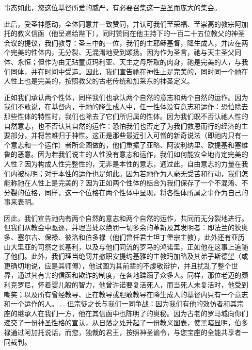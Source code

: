 事态如此，您这位基督所爱的威严，有必要召集这一至圣而庞大的集会。\par

此后，受圣神感动，全体同意并一致赞同，并认可我们至荣福、至崇高的教宗阿加托的教义信函（他呈递给陛下），同时赞同在他主持下的一百二十五位教父的神圣会议的提议，我们教导：圣三中的一位，我们的主耶稣基督，降生成人，并应在两个完美的性体内，无分裂、无混淆地受到颂扬。因为作为圣言，祂与天主圣父同体、永恒；但作为由无玷童贞玛利亚、天主之母所取的肉身，祂是完美的人，与我们同体，并在时间中受造。因此，我们宣告祂在神性上是完美的，同时同一个祂在人性上也是完美的，按照教父的古老传统和加采东的神圣定义。\par

正如我们承认两个性体，同样我们也承认两个自然的意志和两个自然的运作。因为我们不敢说，在基督内，于祂的降生成人中，任一性体没有意志和运作：恐怕除去那些性体的特性时，我们也除去了它们所归属的性体。因为我们既不否认祂人性的自然意志，也不否认其自然的运作：恐怕我们也否定了为我们救恩而行的经济的主要部分，并将苦难归于神性。这正是那些最近引入可憎的新奇说法（即祂内只有一个意志和一个运作）者所企图做的，他们重振了亚略、阿波利纳里、欧提基和塞维鲁的恶意。因为若我们说主的人性没有意志和运作，我们如何能安全地肯定完美的人性？因为构成人性完整性的，无非是本性的意志，通过此，自由意志的力量在我们内被标明；对于本性的运作也是如此。因为若祂作为人毫无受苦和行动，我们怎能称祂在人性上是完美的？因为正如两个性体的结合为我们保存了一个不混淆、不分裂的位格，同样，这一个位格在两个性体中显现，将各性体所属之事作为自己的事来表明。\par

因此，我们宣告祂内有两个自然的意志和两个自然的运作，共同而无分裂地进行。但我们从教会中驱逐，并理当处以绝罚一切多余的革新及其发明者：即法兰的狄奥多、塞尔吉、保禄、彼洛和伯多禄（他们曾任君士坦丁堡宗主教），此外还有亚历山大里亚的司祭之长基利，以及与他们同流的罗马的鸿诺里，正如他在这事上追随了他们。此外，我们理当绝罚并撤职安提约基雅的主教玛加略及其弟子斯德望（或更确切地说，应是其师傅），他试图为其前辈的不虔敬辩护，并且扰乱了整个世界，通过其有害的信函和欺诈的制度，在各地蹂躏了众多人。同样，那位老迈的颇利克罗尼，怀着婴儿般的智力，他曾许诺要复活死人，而当死人未复活时，他受到嘲笑；以及所有曾经教导、正在教导或胆敢教导在降生成人的基督内只有一个意志和一个运作的人。……但宗徒之长与我们一同争战：因为我们有他的效仿者和其宗座的继承人在我们一方，他在其信函中也陈明了的奥秘。因为古老的罗马城向你们递交了一份神圣性格的宣认，从日落之处升起了一份教义图表，使黑暗显明，伯多禄通过阿加托说话，而您，独裁的君王，按照神圣谕令，与您宝座的全能共享者一同裁判。\par

